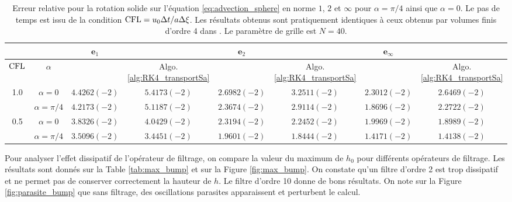 \begin{table}[htbp]
\begin{center}
\begin{tabular}{|cc||cc||cc||cc|}
\hline 
 & & $\mathbf{e}_1$ &   & $\mathbf{e}_2$ &   & $\mathbf{e}_{\infty}$ &   \\ 
\hline 
$\text{CFL}$ & $\alpha$ & \cite{Ullrich2010} & Algo. \ref{alg:RK4_transportSa} & \cite{Ullrich2010} & Algo. \ref{alg:RK4_transportSa} & \cite{Ullrich2010} & Algo. \ref{alg:RK4_transportSa} \\ 
\hline 
1.0 & $\alpha = 0$ & $4.4262(-2)$ & $5.4173(-2)$ & $2.6982(-2)$ & $3.2511(-2)$ & $2.3012(-2)$ & $2.6469(-2)$ \\ 

  & $\alpha = \pi / 4$ & $4.2173(-2)$ & $5.1187(-2)$ & $2.3674(-2)$ & $2.9114(-2)$ & $1.8696(-2)$ & $2.2722(-2)$ \\ 
\hline 
0.5 & $\alpha = 0$ & $3.8326(-2)$ & $4.0429(-2)$ & $2.3194(-2)$ & $2.2452(-2)$ & $1.9969(-2)$ & $1.8989(-2)$ \\ 

  & $\alpha = \pi/4$ & $3.5096(-2)$ & $3.4451(-2)$ & $1.9601(-2)$ & $1.8444(-2)$ & $1.4171(-2)$ & $1.4138(-2)$ \\ 
\hline 
\end{tabular} 
\end{center}
\caption{Erreur relative pour la rotation solide sur l'équation \eqref{eq:advection_sphere} en norme $1$, $2$ et $\infty$ pour $\alpha = \pi / 4$ ainsi que $\alpha=0$. Le pas de temps est issu de la condition $\text{CFL} = u_0 \Delta t / a \Delta \xi$. Les résultats obtenus sont pratiquement identiques à ceux obtenus par volumes finis d'ordre 4 dans \cite{Ullrich2010}. Le paramètre de grille est $N=40$.}
\label{tab:comp_ullrich_bump}
\end{table} 

Pour analyser l'effet dissipatif de l'opérateur de filtrage, on compare la valeur du maximum de $h_0$ pour différents opérateurs de filtrage. Les résultats sont donnés sur la Table \ref{tab:max_bump} et sur la Figure \ref{fig:max_bump}. On constate qu'un filtre d'ordre 2 est trop dissipatif et ne permet pas de conserver correctement la hauteur de $h$. Le filtre d'ordre 10 donne de bons résultats. On note sur la Figure \ref{fig:parasite_bump} que sans filtrage, des oscillations parasites apparaissent et perturbent le calcul.

